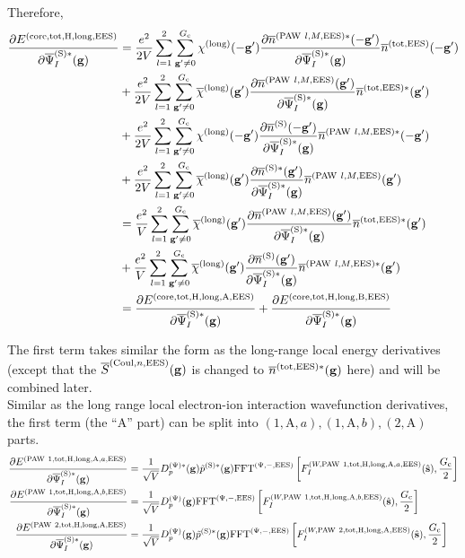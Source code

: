 \documentclass[paper=a4, fontsize=11pt]{article} %
\numberwithin{equation}{section} %
\numberwithin{figure}{section} %
\numberwithin{table}{section} %
\newcommand{\p}{\partial}
\newcommand{\ol}{\overline}
\newcommand{\bg}{{\bf{g}}}
\newcommand{\hs}{{\hat{\bf{s}}}}
\newcommand{\rS}{{\mathrm{S}}}
\newcommand{\rEES}{{\mathrm{EES}}}
\newcommand{\rcore}{{\mathrm{core}}}
\newcommand{\rCo}{{\mathrm{Coul}}}
\newcommand{\rlong}{{\mathrm{long}}}
\newcommand{\rP}{{\mathrm{PAW}}}
\newcommand{\rH}{{\mathrm{H}}}
\newcommand{\rA}{{\mathrm{A}}}
\newcommand{\rB}{{\mathrm{B}}}
\newcommand{\rtot}{{\mathrm{tot}}}
\newcommand{\psigsc}{{\overline \Psi_I^{(\rS)*}(\bg)}}
\newcommand{\Gc}{{G_{\mathrm{c}}}}
\newcommand{\hGc}{{\frac{G_{\mathrm{c}}}{2}}}
\newcommand{\Dpg}{{D^{(\Psi)}_p(\bg)}}
\newcommand{\Dpgc}{{D^{(\Psi)*}_p(\bg)}}
\newcommand{\FFTpiEES}{{\mathrm{FFT}^{(\Psi,-,\rEES)}}}
\begin{document}
Therefore,
\begin{equation}\label{eq:dElongHdp}
\begin{split}
\frac{\p E^{(\rcore,\rtot,\rH,\rlong,\rEES)}}{\p \psigsc}
&= \frac{e^2}{2V}  \sum_{l=1}^2 \sum_{\bg' \neq 0}^{\Gc} \chi^{(\rlong)} (-\bg') \frac{\p \ol{n}^{(\rP\ l,M,\rEES)*}(-\bg')}{\p \psigsc}\ol{n}^{(\rtot,\rEES)}(-\bg') \\
&+ \frac{e^2}{2V}  \sum_{l=1}^2 \sum_{\bg' \neq 0}^{\Gc} \ol \chi^{(\rlong)} (\bg') \frac{\p \ol{n}^{(\rP\ l,M,\rEES)}(\bg')}{\p \psigsc}\ol{n}^{(\rtot,\rEES)*}(\bg') \\
&+ \frac{e^2}{2V}  \sum_{l=1}^2 \sum_{\bg' \neq 0}^{\Gc} \chi^{(\rlong)} (-\bg') \frac{\p \ol{n}^{(\rS)}(-\bg')}{\p \psigsc}\ol{n}^{(\rP\ l,M,\rEES)*}(-\bg') \\
&+ \frac{e^2}{2V}  \sum_{l=1}^2 \sum_{\bg' \neq 0}^{\Gc} \ol \chi^{(\rlong)} (\bg') \frac{\p \ol{n}^{(\rS)*}(\bg')}{\p \psigsc}\ol{n}^{(\rP\ l,M,\rEES)}(\bg') \\
&= \frac{e^2}{V}  \sum_{l=1}^2 \sum_{\bg' \neq 0}^{\Gc} \ol \chi^{(\rlong)} (\bg') \frac{\p \ol{n}^{(\rP\ l,M,\rEES)}(\bg')}{\p \psigsc}\ol{n}^{(\rtot,\rEES)*}(\bg') \\
&+ \frac{e^2}{V}  \sum_{l=1}^2 \sum_{\bg' \neq 0}^{\Gc} \ol \chi^{(\rlong)} (\bg') \frac{\p \ol{n}^{(\rS)}(\bg')}{\p \psigsc}\ol{n}^{(\rP\ l,M,\rEES)*}(\bg') \\
&=  \frac{\p E^{(\rcore,\rtot,\rH,\rlong,\rA,\rEES)}}{\p \psigsc} + \frac{\p E^{(\rcore,\rtot,\rH,\rlong,\rB,\rEES)}}{\p \psigsc}\\
\end{split}
\end{equation}

The first term takes similar the form as the long-range local energy derivatives (except that the $\ol S^{(\rCo,n,\rEES)}(\bg)$ is changed to $\ol{n}^{(\rtot,\rEES)*}(\bg)$ here) and will be combined later.\\

Similar as the long range local electron-ion interaction wavefunction derivatives, the first term (the ``$\rA$'' part) can be split into $(1,\rA,a),(1,\rA,b), (2,\rA)$ parts.
\begin{equation}
\begin{split}
\frac{\p E^{(\rP\ 1,\rtot,\rH,\rlong,\rA,a,\rEES)}}{\p \psigsc} &=  \frac{1}{\sqrt{V}} \Dpgc \tilde p^{(\rS)*}(\bg) \FFTpiEES\left[ F_I^{(W,\rP\ 1,\rtot,\rH,\rlong,\rA,a,\rEES)}(\hs),\hGc\right]\\
\frac{\p E^{(\rP\ 1,\rtot,\rH,\rlong,\rA,b,\rEES)}}{\p \psigsc}&=  \frac{1}{\sqrt{V}} \Dpg \FFTpiEES\left[ F_I^{(W,\rP\ 1,\rtot,\rH,\rlong,\rA,b,\rEES)}(\hs),\hGc\right]\\
\frac{\p E^{(\rP\ 2,\rtot,\rH,\rlong,\rA,\rEES)}}{\p \psigsc}
&= \frac{1}{\sqrt{V}} \Dpg\tilde p^{(\rS)*}(\bg) \FFTpiEES\left[ F_I^{(W,\rP\ 2,\rtot,\rH,\rlong,\rA,\rEES)}(\hs),\hGc\right]\\
\end{split}
\end{equation}
\end{document}
